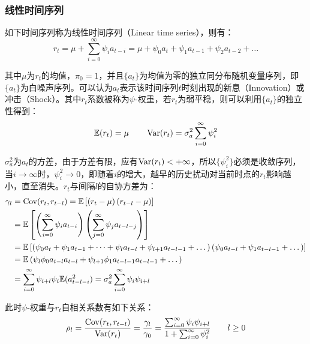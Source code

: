 \documentclass[11pt]{article}
\begin{document}
\subsubsection{线性时间序列}

如下时间序列称为线性时间序列（Linear time series），则有：
\begin{equation*}
    r_t = \mu + \sum_{i=0}^{\infty} \psi_i a_{t-i} = \mu + \psi_0 a_{t} + \psi_1 a_{t-1} + \psi_2 a_{t-2} + \dots
\end{equation*}

其中$\mu$为$r_t$的均值，$\pi_0=1$，并且$\{a_t\}$为均值为零的独立同分布随机变量序列，即$\{a_t\}$为白噪声序列。可以认为$a_t$表示该时间序列$t$时刻出现的新息（Innovation）或冲击（Shock）。其中$r_t$系数被称为$\psi$-权重，若$r_t$为弱平稳，则可以利用$\{a_t\}$的独立性得到：
\begin{equation*}
    \mathbb{E}(r_t) = \mu \qquad \operatorname{Var}(r_t) = \sigma_{a}^{2}\sum_{i=0}^{\infty} \psi_{i}^{2}
\end{equation*}

$\sigma_{a}^{2}$为$a_t$的方差，由于方差有限，应有$\operatorname{Var}(r_t)<+\infty$，所以$\{\psi_{i}^{2}\}$必须是收敛序列，当$i\rightarrow\infty$时，$\psi_{i}^{2}\rightarrow 0$，即随着$i$的增大，越早的历史扰动对当前时点的$r_t$影响越小，直至消失。$r_t$与间隔$l$的自协方差为：
\begin{align*}
    \gamma_l &= \operatorname{Cov}(r_t,r_{t-l})
    = \mathbb{E}\left[\left(r_t - \mu \right) \left(r_{t-l} - \mu \right) \right] \\
    &= \mathbb{E}\left[\left( \sum_{i=0}^{\infty} \psi_i a_{t-i} \right) \left( \sum_{j=0}^{\infty} \psi_j a_{t-l-j} \right) \right] \\
    &= \mathbb{E} \left[ \left( \psi_0 a_{t} + \psi_1 a_{t-1}  + \dots + \psi_l a_{t-l} + \psi_{l+1} a_{t-l-1}  + \dots \right) \left( \psi_0 a_{t-l} + \psi_1 a_{t-l-1} + \dots \right) \right] \\
    &= \mathbb{E} \left( \psi_l \phi_0 a_{t-l} a_{t-l} + \psi_{l+1} \phi_1 a_{t-l-1} a_{t-l-1}  + \dots \right)\\
    &= \sum_{i=0}^{\infty} \psi_{i+l} \psi_{i} \mathbb{E}(a_{t-l-i}^{2}) 
    = \sigma_{a}^{2} \sum_{i=0}^{\infty} \psi_i \psi_{i+l} 
\end{align*}

此时$\psi$-权重与$r_t$自相关系数有如下关系：
\begin{equation*}
    \rho_l = \frac{\operatorname{Cov}(r_t,r_{t-l})}{\operatorname{Var}(r_t)}
    = \frac{\gamma_l}{\gamma_0}
    = \frac{\sum_{i=0}^{\infty} \psi_i \psi_{i+l}}{1+ \sum_{i=0}^{\infty} \psi_i^2} \qquad l \geq 0
\end{equation*}
\end{document}
